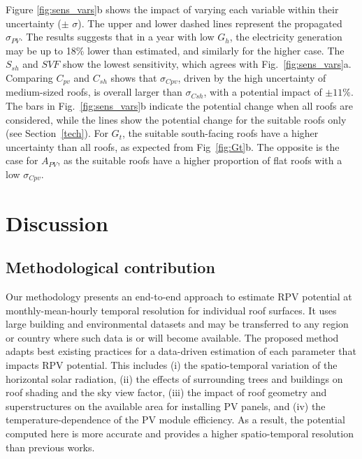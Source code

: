 Figure \ref{fig:sens_vars}b shows the impact of varying each variable within their uncertainty ($\pm$ $\sigma$). 
The upper and lower dashed lines represent the propagated $\sigma_{PV}$. 
The results suggests that in a year with low $G_h$, the electricity generation may be up to 18\% lower than estimated, and similarly for the higher case. 
The $S_{sh}$ and $SVF$ show the lowest sensitivity, which agrees with Fig.~\ref{fig:sens_vars}a.
Comparing $C_{pv}$ and $C_{sh}$ shows that $\sigma_{Cpv}$, driven by the high uncertainty of medium-sized roofs, is overall larger than $\sigma_{Csh}$, with a potential impact of $\pm 11 \%$. 
%
The bars in Fig.~\ref{fig:sens_vars}b indicate the potential change when all roofs are considered, while the lines show the potential change for the suitable roofs only (see Section~\ref{tech}). 
For $G_t$, the suitable south-facing roofs have a higher uncertainty than all roofs, as expected from Fig~\ref{fig:Gt}b. 
The opposite is the case for $A_{PV}$, as the suitable roofs have a higher proportion of flat roofs with a low $\sigma_{Cpv}$.


\section{Discussion}
\label{discussion_pv}

\subsection{Methodological contribution}

Our methodology presents an end-to-end approach to estimate RPV potential at monthly-mean-hourly temporal resolution for individual roof surfaces. It uses large building and environmental datasets and may be transferred to any region or country where such data is or will become available. 
The proposed method adapts best existing practices for a data-driven estimation of each parameter that impacts RPV potential. This includes
(i) the spatio-temporal variation of the horizontal solar radiation,
(ii) the effects of surrounding trees and buildings on roof shading and the sky view factor,
(iii) the impact of roof geometry and superstructures on the available area for installing PV panels, and
(iv) the temperature-dependence of the PV module efficiency.
As a result, the potential computed here is more accurate and provides a higher spatio-temporal resolution than previous works.

